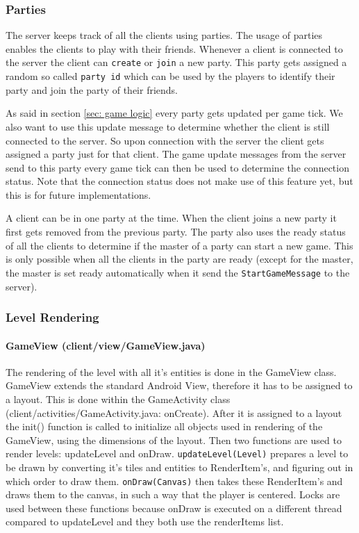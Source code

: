 \documentclass[../main.tex]{subfiles}
\begin{document}
        \subsubsection{Parties}
        The server keeps track of all the clients using parties. The usage of parties enables the clients to play with their friends. Whenever a client is connected to the server the client can \texttt{create} or \texttt{join} a new party. This party gets assigned a random so called \texttt{party id} which can be used by the players to identify their party and join the party of their friends.
        
        As said in section \ref{sec: game logic} every party gets updated per game tick. We also want to use this update message to determine whether the client is still connected to the server. So upon connection with the server the client gets assigned a party just for that client. The game update messages from the server send to this party every game tick can then be used to determine the connection status. Note that the connection status does not make use of this feature yet, but this is for future implementations.

        A client can be in one party at the time. When the client joins a new party it first gets removed from the previous party. The party also uses the ready status of all the clients to determine if the master of a party can start a new game. This is only possible when all the clients in the party are ready (except for the master, the master is set ready automatically when it send the \texttt{StartGameMessage} to the server).

		\subsubsection{Level Rendering}
        \paragraph{GameView (\tiny client/view/GameView.java\normalsize)}
        The rendering of the level with all it's entities is done in the GameView class. GameView extends the standard Android View, therefore it has to be assigned to a layout. This is done within the GameActivity class (\tiny client/activities/GameActivity.java: onCreate\normalsize). After it is assigned to a layout the init() function is called to initialize all objects used in rendering of the GameView, using the dimensions of the layout. Then two functions are used to render levels: updateLevel and onDraw. \texttt{updateLevel(Level)} prepares a level to be drawn by converting it's tiles and entities to RenderItem's, and figuring out in which order to draw them. \texttt{onDraw(Canvas)} then takes these RenderItem's and draws them to the canvas, in such a way that the player is centered. Locks are used between these functions because onDraw is executed on a different thread compared to updateLevel and they both use the renderItems list.
\end{document}
